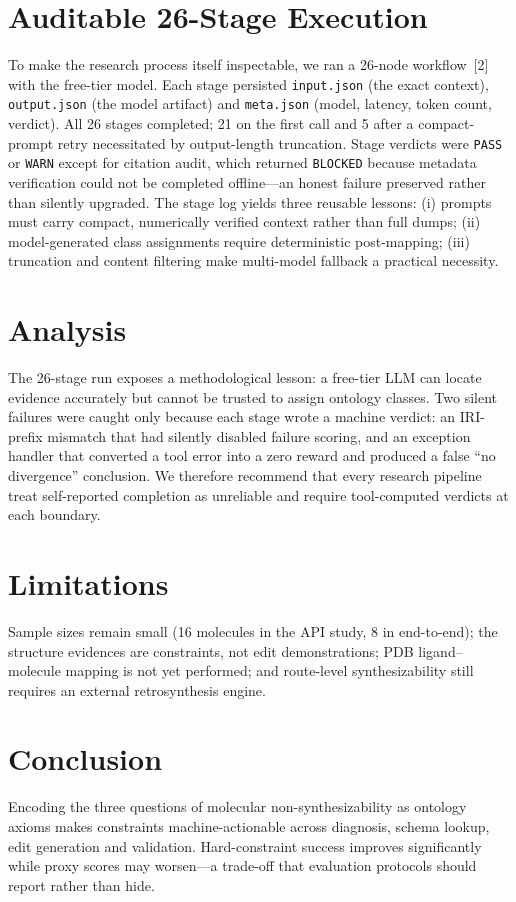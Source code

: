 \documentclass[11pt,a4paper]{article}
\begin{document}
\section{Auditable 26-Stage Execution}
To make the research process itself inspectable, we ran a 26-node workflow~[2] with the free-tier model. Each stage persisted \texttt{input.json} (the exact context), \texttt{output.json} (the model artifact) and \texttt{meta.json} (model, latency, token count, verdict). All 26 stages completed; 21 on the first call and 5 after a compact-prompt retry necessitated by output-length truncation. Stage verdicts were \texttt{PASS} or \texttt{WARN} except for citation audit, which returned \texttt{BLOCKED} because metadata verification could not be completed offline---an honest failure preserved rather than silently upgraded. The stage log yields three reusable lessons: (i) prompts must carry compact, numerically verified context rather than full dumps; (ii) model-generated class assignments require deterministic post-mapping; (iii) truncation and content filtering make multi-model fallback a practical necessity.

\section{Analysis}
The 26-stage run exposes a methodological lesson: a free-tier LLM can locate evidence accurately but cannot be trusted to assign ontology classes. Two silent failures were caught only because each stage wrote a machine verdict: an IRI-prefix mismatch that had silently disabled failure scoring, and an exception handler that converted a tool error into a zero reward and produced a false ``no divergence'' conclusion. We therefore recommend that every research pipeline treat self-reported completion as unreliable and require tool-computed verdicts at each boundary.

\section{Limitations}
Sample sizes remain small (16 molecules in the API study, 8 in end-to-end); the structure evidences are constraints, not edit demonstrations; PDB ligand--molecule mapping is not yet performed; and route-level synthesizability still requires an external retrosynthesis engine.

\section{Conclusion}
Encoding the three questions of molecular non-synthesizability as ontology axioms makes constraints machine-actionable across diagnosis, schema lookup, edit generation and validation. Hard-constraint success improves significantly while proxy scores may worsen---a trade-off that evaluation protocols should report rather than hide.



\end{document}
